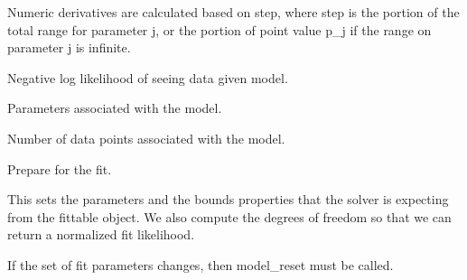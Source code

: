 \documentclass[letterpaper,10pt,english]{sphinxmanual}
\begin{document}
\begin{fulllineitems}
\begin{fulllineitems}
Numeric derivatives are calculated based on step, where step is
the portion of the total range for parameter j, or the portion of
point value p\_j if the range on parameter j is infinite.

\end{fulllineitems}


\begin{fulllineitems}
\label{api/fitproblem:refl1d.fitproblem.FitProblem.model_nllf}
Negative log likelihood of seeing data given model.

\end{fulllineitems}


\begin{fulllineitems}
\label{api/fitproblem:refl1d.fitproblem.FitProblem.model_parameters}
Parameters associated with the model.

\end{fulllineitems}


\begin{fulllineitems}
\label{api/fitproblem:refl1d.fitproblem.FitProblem.model_points}
Number of data points associated with the model.

\end{fulllineitems}


\begin{fulllineitems}
\label{api/fitproblem:refl1d.fitproblem.FitProblem.model_reset}
Prepare for the fit.

This sets the parameters and the bounds properties that the
solver is expecting from the fittable object.  We also compute
the degrees of freedom so that we can return a normalized fit
likelihood.

If the set of fit parameters changes, then model\_reset must
be called.

\end{fulllineitems}



\end{fulllineitems}
\end{document}
